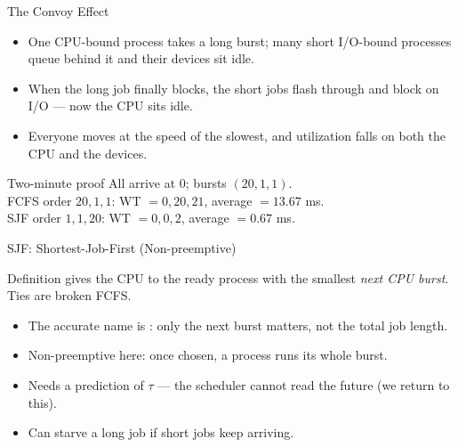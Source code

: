 \documentclass[aspectratio=169]{beamer}
\begin{document}
\begin{frame}{The Convoy Effect}
  \begin{itemize}
    \item One CPU-bound process takes a long burst; many short I/O-bound
      processes queue behind it and their devices sit idle.
    \item When the long job finally blocks, the short jobs flash through and
      block on I/O --- now the CPU sits idle.
    \item Everyone moves at the speed of the slowest, and utilization falls
      on both the CPU and the devices.
  \end{itemize}
  \vspace{0.1cm}
  \begin{exampleblock}{Two-minute proof}
    All arrive at 0; bursts $(20,1,1)$.\\
    FCFS order $20,1,1$: WT $=0,20,21$, average $=13.67$ ms.\\
    SJF order $1,1,20$: WT $=0,0,2$, average $=0.67$ ms.
  \end{exampleblock}
\end{frame}

\begin{frame}{SJF: Shortest-Job-First (Non-preemptive)}
  \begin{block}{Definition}
     gives the CPU to the ready process with the
    smallest \emph{next CPU burst}. Ties are broken FCFS.
  \end{block}
  \begin{itemize}
    \item The accurate name is : only the next
      burst matters, not the total job length.
    \item Non-preemptive here: once chosen, a process runs its whole burst.
    \item Needs a prediction of $\tau$ --- the scheduler cannot read the
      future (we return to this).
    \item Can starve a long job if short jobs keep arriving.
  \end{itemize}
\end{frame}
\end{document}
